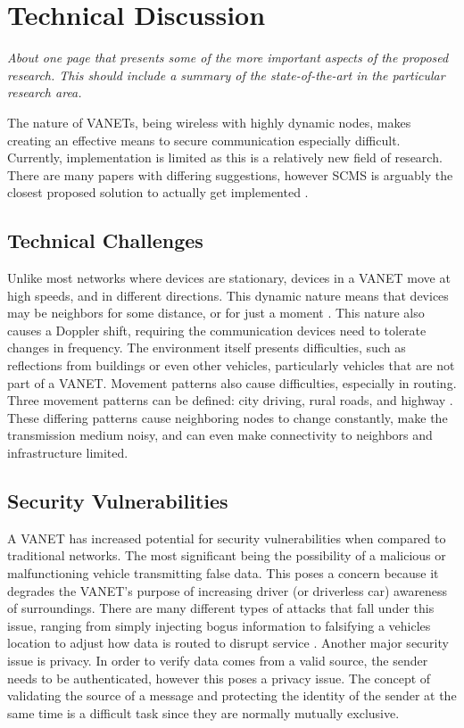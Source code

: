 \documentclass {article}
\newcommand{\sechint}[1]{\small{\emph{#1}} \bigskip}
\begin{document}
\section{Technical Discussion}{\sechint{About one page that presents some of the more important aspects of the proposed research. This should include a summary of the state-of-the-art in the particular research area.}}

The nature of VANETs, being wireless with highly dynamic nodes, makes creating an effective means to secure communication especially difficult. Currently, implementation is limited as this is a relatively new field of research. There are many papers with differing suggestions, however SCMS is arguably the closest proposed solution to actually get implemented \autocite{SecCredMgr}.

\subsection{Technical Challenges}
Unlike most networks where devices are stationary, devices in a VANET move at high speeds, and in different directions. This dynamic nature means that devices may be neighbors for some distance, or for just a moment \autocite{CommPatterns}. This nature also causes a Doppler shift, requiring the communication devices need to tolerate changes in frequency. The environment itself presents difficulties, such as reflections from buildings or even other vehicles, particularly vehicles that are not part of a VANET. Movement patterns also cause difficulties, especially in routing. Three movement patterns can be defined: city driving, rural roads, and highway \autocite{CommPatterns}. These differing patterns cause neighboring nodes to change constantly, make the transmission medium noisy, and can even make connectivity to neighbors and infrastructure limited.

\subsection{Security Vulnerabilities}
A VANET has increased potential for security vulnerabilities when compared to traditional networks. The most significant being the possibility of a malicious or malfunctioning vehicle transmitting false data. This poses a concern because it degrades the VANET's purpose of increasing driver (or driverless car) awareness of surroundings. There are many different types of attacks that fall under this issue, ranging from simply injecting bogus information to falsifying a vehicles location to adjust how data is routed to disrupt service \autocite{SecVANet}. Another major security issue is privacy. In order to verify data comes from a valid source, the sender needs to be authenticated, however this poses a privacy issue. The concept of validating the source of a message and protecting the identity of the sender at the same time is a difficult task since they are normally mutually exclusive.
\end{document}

